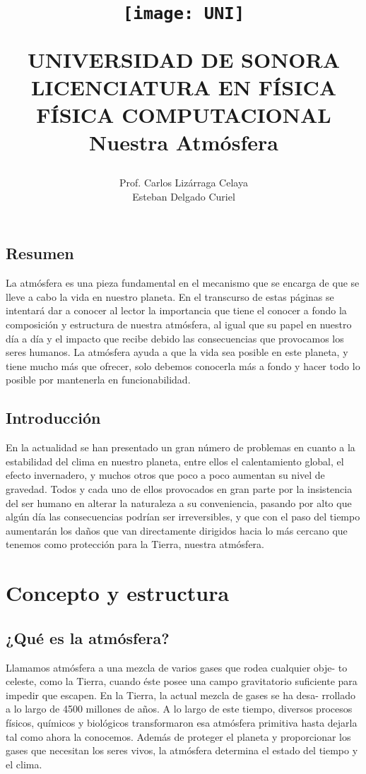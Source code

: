\documentclass{article}
\title{\begin{figure}[h]
\texttt{[image: UNI]}
\centering
\end{figure}
UNIVERSIDAD DE SONORA\\
\vspace{0.2cm}
LICENCIATURA EN FÍSICA\\
\vspace{0.2cm}
FÍSICA COMPUTACIONAL\\
\vspace{0.7cm}
\huge{Nuestra Atmósfera}}\vspace{0.2cm}
\author{Prof. Carlos Lizárraga Celaya\\\vspace{0.17cm}
Esteban Delgado Curiel}
\begin{document}
\maketitle
\newpage
\begin{centering}
\section*{Resumen}
\end{centering}
La atmósfera es una pieza fundamental en el mecanismo que se encarga de que se lleve a cabo la vida en nuestro planeta. En el transcurso de estas páginas se intentará dar a conocer al lector la importancia que tiene el conocer a fondo la composición y estructura de nuestra atmósfera, al igual que su papel en nuestro día a día y el impacto que recibe debido las consecuencias que provocamos los seres humanos.
La atmósfera ayuda a que la vida sea posible en este planeta, y tiene mucho más que ofrecer, solo debemos conocerla más a fondo y hacer todo lo posible por mantenerla en funcionabilidad. 
\vspace{1.5cm}

\begin{centering}
\section*{Introducción}
\end{centering}
En la actualidad se han presentado un gran número de problemas en cuanto
a la estabilidad del clima en nuestro planeta, entre ellos el calentamiento global,
el efecto invernadero, y muchos otros que poco a poco aumentan su nivel de
gravedad. Todos y cada uno de ellos provocados en gran parte por la insistencia
del ser humano en alterar la naturaleza a su conveniencia, pasando por alto
que algún día las consecuencias podrían ser irreversibles, y que con el paso del
tiempo aumentarán los daños que van directamente dirigidos hacia lo más cercano
que tenemos como protección para la Tierra, nuestra atmósfera.
\vspace{1.5cm}

\section{Concepto y estructura}\vspace{0.5cm}
\subsection{¿Qué es la atmósfera?}
Llamamos atmósfera a una mezcla de varios gases que rodea cualquier obje-
to celeste, como la Tierra, cuando éste posee una campo gravitatorio suficiente
para impedir que escapen. En la Tierra, la actual mezcla de gases se ha desa-
rrollado a lo largo de 4500 millones de años. A lo largo de este tiempo, diversos
procesos físicos, químicos y biológicos transformaron esa atmósfera primitiva
hasta dejarla tal como ahora la conocemos. Además de proteger el planeta y
proporcionar los gases que necesitan los seres vivos, la atmósfera determina el estado del tiempo y el clima.\\
\end{document}
